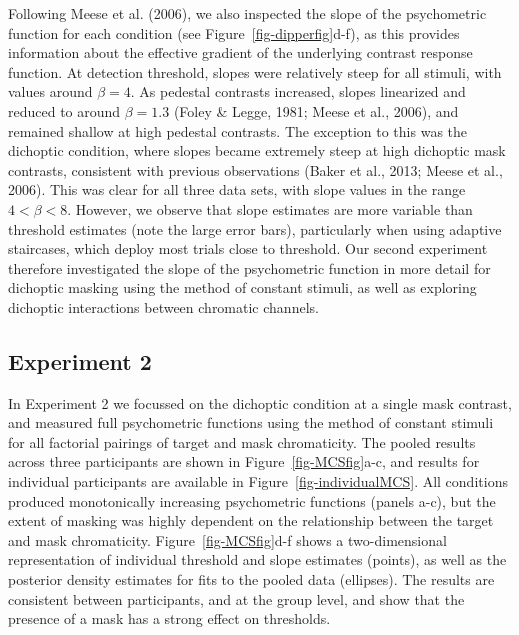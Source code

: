 \documentclass[
  letterpaper,
  DIV=11,
  numbers=noendperiod]{scrartcl}
\begin{document}
Following Meese et al. (2006), we also inspected the slope of the
psychometric function for each condition (see
Figure~\ref{fig-dipperfig}d-f), as this provides information about the
effective gradient of the underlying contrast response function. At
detection threshold, slopes were relatively steep for all stimuli, with
values around \(\beta=4\). As pedestal contrasts increased, slopes
linearized and reduced to around \(\beta=1.3\) (Foley \& Legge, 1981;
Meese et al., 2006), and remained shallow at high pedestal contrasts.
The exception to this was the dichoptic condition, where slopes became
extremely steep at high dichoptic mask contrasts, consistent with
previous observations (Baker et al., 2013; Meese et al., 2006). This was
clear for all three data sets, with slope values in the range
\(4 < \beta < 8\). However, we observe that slope estimates are more
variable than threshold estimates (note the large error bars),
particularly when using adaptive staircases, which deploy most trials
close to threshold. Our second experiment therefore investigated the
slope of the psychometric function in more detail for dichoptic masking
using the method of constant stimuli, as well as exploring dichoptic
interactions between chromatic channels.

\subsection{Experiment 2}\label{experiment-2}

In Experiment 2 we focussed on the dichoptic condition at a single mask
contrast, and measured full psychometric functions using the method of
constant stimuli for all factorial pairings of target and mask
chromaticity. The pooled results across three participants are shown in
Figure~\ref{fig-MCSfig}a-c, and results for individual participants are
available in Figure~\ref{fig-individualMCS}. All conditions produced
monotonically increasing psychometric functions (panels a-c), but the
extent of masking was highly dependent on the relationship between the
target and mask chromaticity. Figure~\ref{fig-MCSfig}d-f shows a
two-dimensional representation of individual threshold and slope
estimates (points), as well as the posterior density estimates for fits
to the pooled data (ellipses). The results are consistent between
participants, and at the group level, and show that the presence of a
mask has a strong effect on thresholds.
\end{document}

